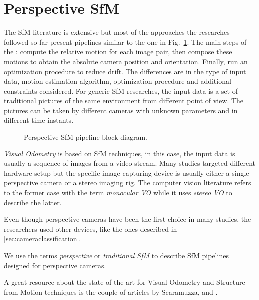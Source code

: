 \section{Perspective SfM}
The SfM literature is extensive but most of the approaches the 
researches followed so far present pipelines similar to the one in 
Fig.~\ref{fig:block_diagram}.
The main steps of the : compute the relative motion for each image
pair, then compose these motions to obtain the absolute camera position and 
orientation. Finally, run an optimization procedure to reduce drift.
The differences are in the type of input data, motion estimation algorithm,
optimization procedure and additional constraints considered.
For generic SfM researches, the input data is a set of traditional pictures of 
the same environment from different point of view. The pictures can be taken by 
different cameras with unknown parameters and in different time instants.
\begin{figure}
	\centering
	\def\svgwidth{0.5\columnwidth}
	
	\caption{Perspective SfM pipeline block diagram.}
	\label{fig:block_diagram}
\end{figure}
\textit{Visual Odometry} is based on SfM techniques, 
in this case, the input data is usually a sequence 
of images from a video stream. Many studies targeted different hardware setup 
but the specific image capturing device is usually either a single perspective 
camera or a stereo imaging rig. The computer vision literature refers to the
former case with the term \textit{monocular VO} while it uses \textit{stereo VO}
to describe the latter.

Even though perspective cameras have been the first choice in many studies, 
the researchers used other devices, like the ones described in 
\ref{sec:cameraclassification}.

We use the terms \textit{perspective} or \textit{traditional SfM} to describe 
SfM pipelines designed for perspective cameras.

A great resource about the state of the art for Visual Odometry and Structure 
from Motion techniques is the couple of articles by Scaramuzza,  
\cite{scaramuzzaVisualOdometryI} and \cite{scaramuzzaVisualOdometryII}.

